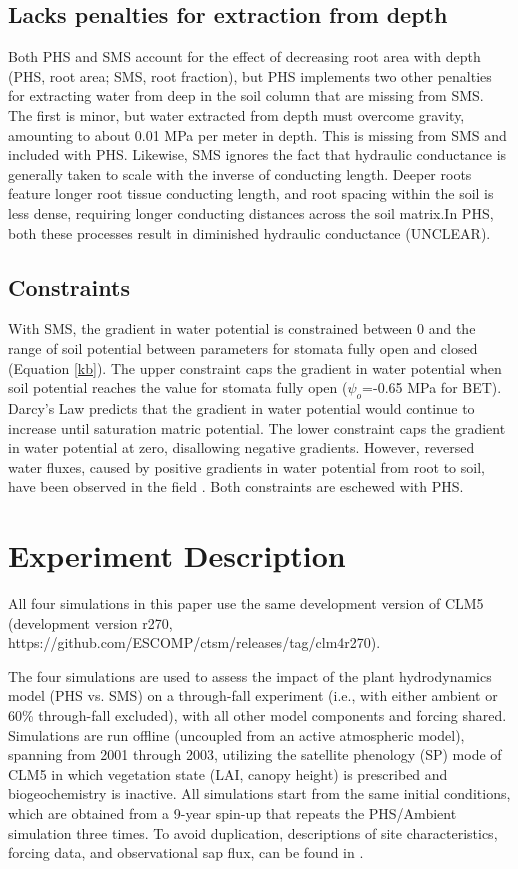 \documentclass[draft,linenumbers]{agujournal}
\begin{document}
    \subsection{Lacks penalties for extraction from depth}
    Both PHS and SMS account for the effect of decreasing root area with depth (PHS, root area; SMS, root fraction), but PHS implements two other penalties for extracting water from deep in the soil column that are missing from SMS. The first is minor, but water extracted from depth must overcome gravity, amounting to about 0.01 MPa per meter in depth. This is missing from SMS and included with PHS.  Likewise, SMS ignores the fact that hydraulic conductance is generally taken to scale with the inverse of conducting length. Deeper roots feature longer root tissue conducting length, and root spacing within the soil is less dense, requiring longer conducting distances across the soil matrix.In PHS, both these processes result in diminished hydraulic conductance (UNCLEAR).

    \subsection{Constraints}
    With SMS, the gradient in water potential is constrained between 0 and the range of soil potential between parameters for stomata fully open and closed (Equation \ref{kb}). The upper constraint caps the gradient in water potential when soil potential reaches the value for stomata fully open ($\psi_o$=-0.65 MPa for BET). Darcy's Law predicts that the gradient in water potential would continue to increase until saturation matric potential. The lower constraint caps the gradient in water potential at zero, disallowing negative gradients. However, reversed water fluxes, caused by positive gradients in water potential from root to soil, have been observed in the field \citep{burgess1998}. Both constraints are eschewed with PHS.     

\section{Experiment Description}
All four simulations in this paper use the same development version of CLM5 (development version r270, https://github.com/ESCOMP/ctsm/releases/tag/clm4\textunderscore r270).

The four simulations are used to assess the impact of the plant hydrodynamics model (PHS vs. SMS) on a through-fall experiment (i.e., with either ambient or 60\% through-fall excluded), with all other model components and forcing shared. Simulations are run offline (uncoupled from an active atmospheric model), spanning from 2001 through 2003, utilizing the satellite phenology (SP) mode of CLM5 in which vegetation state (LAI, canopy height) is prescribed and biogeochemistry is inactive. All simulations start from the same initial conditions, which are obtained from a 9-year spin-up that repeats the PHS/Ambient simulation three times. To avoid duplication, descriptions of site characteristics, forcing data, and observational sap flux, can be found in \cite{fisher2007}.
\end{document}
